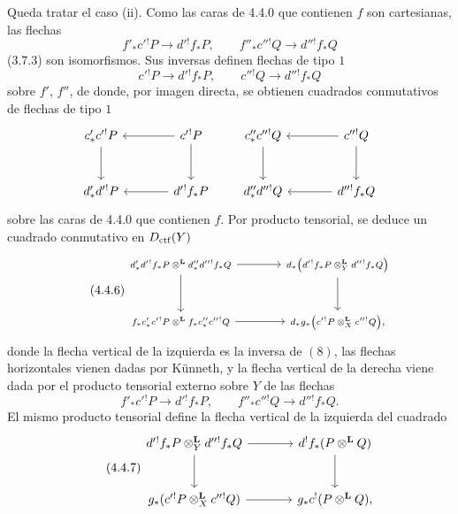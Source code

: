 \begin{prooftext}[Demostración]
Queda tratar el caso (ii). Como las caras de 4.4.0 que contienen $f$ son cartesianas, las flechas
\[
f'_*c'{}^!P\longrightarrow d'{}^!f_*P,\qquad
f''_*c''{}^!Q\longrightarrow d''{}^!f_*Q
\]
(3.7.3) son isomorfismos. Sus inversas definen flechas de tipo $1$
\[
c'{}^!P\longrightarrow d'{}^!f_*P,\qquad
c''{}^!Q\longrightarrow d''{}^!f_*Q
\]
sobre $f'$, $f''$, de donde, por imagen directa, se obtienen cuadrados conmutativos de flechas de tipo $1$
\[
\begin{tikzcd}[column sep=large,row sep=large]
c'_*c'{}^!P \arrow[d] & c'{}^!P\arrow[l]\arrow[d]\\
d'_*d'{}^!P & d'{}^!f_*P\arrow[l]
\end{tikzcd}
\qquad
\begin{tikzcd}[column sep=large,row sep=large]
c''_*c''{}^!Q \arrow[d] & c''{}^!Q\arrow[l]\arrow[d]\\
d''_*d''{}^!Q & d''{}^!f_*Q\arrow[l]
\end{tikzcd}
\]
sobre las caras de 4.4.0 que contienen $f$. Por producto tensorial, se deduce un cuadrado conmutativo en $D_{\mathrm{ctf}}(Y)$
\begin{equation}
\tag{4.4.6}
\begin{tikzcd}[column sep=large,row sep=large,cells={nodes={font=\scriptsize}}]
d'_*d'{}^!f_*P\otimes^{\mathbf L}d''_*d''{}^!f_*Q
 \arrow[r]\arrow[d] &
d_*\bigl(d'{}^!f_*P\otimes_Y^{\mathbf L}d''{}^!f_*Q\bigr)\arrow[d]\\
f_*c'_*c'{}^!P\otimes^{\mathbf L}f_*c''_*c''{}^!Q
 \arrow[r] &
d_*g_*\bigl(c'{}^!P\otimes_X^{\mathbf L}c''{}^!Q\bigr),
\end{tikzcd}
\end{equation}
donde la flecha vertical de la izquierda es la inversa de $(8)$, las flechas horizontales vienen dadas por Künneth, y la flecha vertical de la derecha viene dada por el producto tensorial externo sobre $Y$ de las flechas
\[
f'_*c'{}^!P\longrightarrow d'{}^!f_*P,\qquad
f''_*c''{}^!Q\longrightarrow d''{}^!f_*Q.
\]
El mismo producto tensorial define la flecha vertical de la izquierda del cuadrado
\begin{equation}
\tag{4.4.7}
\begin{tikzcd}[column sep=large,row sep=large]
d'{}^!f_*P\otimes_Y^{\mathbf L}d''{}^!f_*Q
 \arrow[r]\arrow[d] &
d^!f_*(P\otimes^{\mathbf L}Q)\arrow[d]\\
g_*(c'{}^!P\otimes_X^{\mathbf L}c''{}^!Q)
 \arrow[r] &
g_*c^!(P\otimes^{\mathbf L}Q),
\end{tikzcd}
\end{equation}

\end{prooftext}
